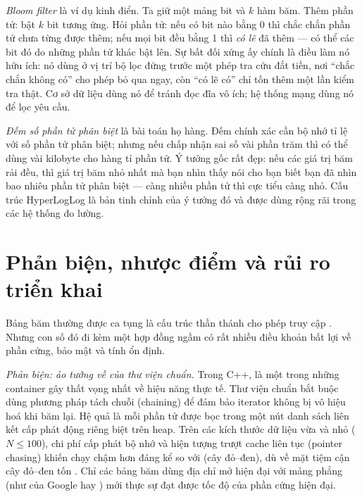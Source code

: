 \documentclass[../../algorithm.tex]{subfiles}
\begin{document}
\emph{Bloom filter} là ví dụ kinh điển. Ta giữ một mảng bit và \(k\) hàm băm. Thêm phần tử: bật \(k\) bit tương ứng. Hỏi phần tử: nếu có bit nào bằng 0 thì chắc chắn phần tử chưa từng được thêm; nếu mọi bit đều bằng 1 thì \emph{có lẽ} đã thêm --- có thể các bit đó do những phần tử khác bật lên. Sự bất đối xứng ấy chính là điều làm nó hữu ích: nó dùng ở vị trí bộ lọc đứng trước một phép tra cứu đắt tiền, nơi ``chắc chắn không có'' cho phép bỏ qua ngay, còn ``có lẽ có'' chỉ tốn thêm một lần kiểm tra thật. Cơ sở dữ liệu dùng nó để tránh đọc đĩa vô ích; hệ thống mạng dùng nó để lọc yêu cầu.

\emph{Đếm số phần tử phân biệt} là bài toán họ hàng. Đếm chính xác cần bộ nhớ tỉ lệ với số phần tử phân biệt; nhưng nếu chấp nhận sai số vài phần trăm thì có thể dùng vài kilobyte cho hàng tỉ phần tử. Ý tưởng gốc rất đẹp: nếu các giá trị băm rải đều, thì giá trị băm nhỏ nhất mà bạn nhìn thấy nói cho bạn biết bạn đã nhìn bao nhiêu phần tử phân biệt --- càng nhiều phần tử thì cực tiểu càng nhỏ. Cấu trúc HyperLogLog\cite{flajolet2007} là bản tinh chỉnh của ý tưởng đó và được dùng rộng rãi trong các hệ thống đo lường.

\section{Phản biện, nhược điểm và rủi ro triển khai}

Bảng băm thường được ca tụng là cấu trúc thần thánh cho phép truy cập . Nhưng con số  đó đi kèm một hợp đồng ngầm có rất nhiều điều khoản bất lợi về phần cứng, bảo mật và tính ổn định.

\emph{Phản biện: ảo tưởng về  của thư viện chuẩn.} Trong C++,  là một trong những container gây thất vọng nhất về hiệu năng thực tế. Thư viện chuẩn bắt buộc dùng phương pháp tách chuỗi (chaining) để đảm bảo iterator không bị vô hiệu hoá khi băm lại. Hệ quả là mỗi phần tử được bọc trong một nút danh sách liên kết cấp phát động riêng biệt trên heap. Trên các kích thước dữ liệu vừa và nhỏ (\(N \le 100\)), chi phí cấp phát bộ nhớ và hiện tượng trượt cache liên tục (pointer chasing) khiến  chạy chậm hơn đáng kể so với  (cây đỏ--đen), dù về mặt tiệm cận cây đỏ--đen tốn . Chỉ các bảng băm dùng địa chỉ mở hiện đại với mảng phẳng (như  của Google hay ) mới thực sự đạt được tốc độ của phần cứng hiện đại.
\end{document}
